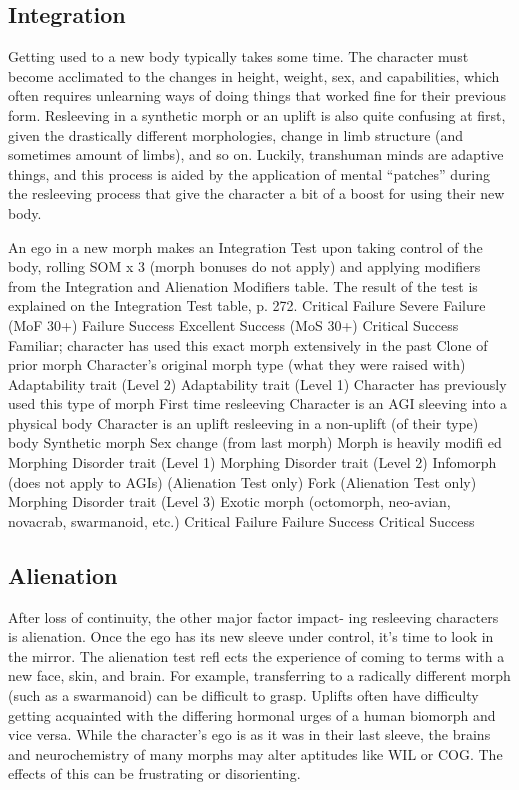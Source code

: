 \subsection{Integration}

Getting used to a new body typically takes some time. 
The character must become acclimated to the changes 
in height, weight, sex, and capabilities, which often 
requires unlearning ways of doing things that worked 
fine for their previous form. Resleeving in a synthetic 
morph or an uplift is also quite confusing at first, 
given the drastically different morphologies, change in 
limb structure (and sometimes amount of limbs), and 
so on. Luckily, transhuman minds are adaptive things, 
and this process is aided by the application of mental 
``patches'' during the resleeving process that give the 
character a bit of a boost for using their new body.

An ego in a new morph makes an Integration Test 
upon taking control of the body, rolling SOM x 3 (morph 
bonuses do not apply) and applying modifiers from the 
Integration and Alienation Modifiers table. The result of 
the test is explained on the Integration Test table, p. 272.
Critical Failure
Severe Failure (MoF 30+)
Failure
Success
Excellent Success (MoS 30+)
Critical Success
Familiar; character has used this exact morph extensively in the past
Clone of prior morph
Character's original morph type (what they were raised with)
Adaptability trait (Level 2)
Adaptability trait (Level 1)
Character has previously used this type of morph
First time resleeving
Character is an AGI sleeving into a physical body
Character is an uplift resleeving in a non-uplift (of their type) body
Synthetic morph
Sex change (from last morph)
Morph is heavily modiﬁ ed
Morphing Disorder trait (Level 1)
Morphing Disorder trait (Level 2)
Infomorph (does not apply to AGIs) (Alienation Test only)
Fork (Alienation Test only)
Morphing Disorder trait (Level 3)
Exotic morph (octomorph, neo-avian, novacrab, swarmanoid, etc.)
Critical Failure
Failure
Success
Critical Success

\subsection{Alienation}

After loss of continuity, the other major factor impact-
ing resleeving characters is alienation. Once the ego 
has its new sleeve under control, it's time to look in 
the mirror. The alienation test refl ects the experience of 
coming to terms with a new face, skin, and brain. For 
example, transferring to a radically different morph 
(such as a swarmanoid) can be difficult to grasp. 
Uplifts often have difficulty getting acquainted with 
the differing hormonal urges of a human biomorph 
and vice versa. While the character's ego is as it was 
in their last sleeve, the brains and neurochemistry of 
many morphs may alter aptitudes like WIL or COG. 
The effects of this can be frustrating or disorienting.

